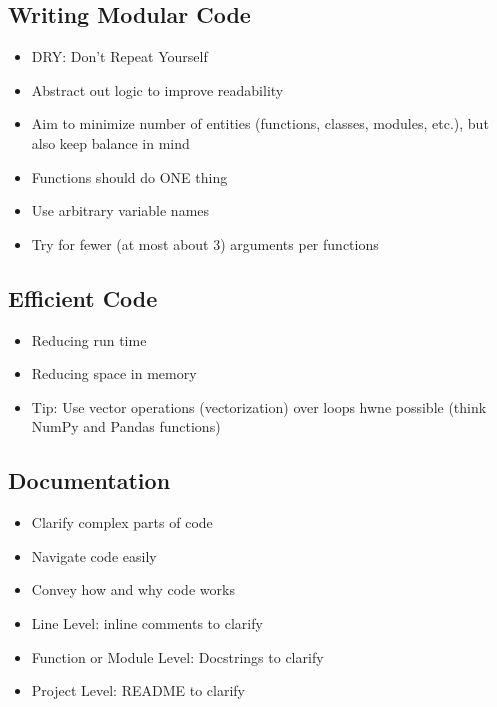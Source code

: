 \subsection{Writing Modular Code}
\begin{itemize}
	\item DRY: Don't Repeat Yourself
	\item Abstract out logic to improve readability
	\item Aim to minimize number of entities (functions, classes, modules, etc.), but also keep balance in mind
	\item Functions should do ONE thing
	\item Use arbitrary variable names
	\item Try for fewer (at most about 3) arguments per functions
\end{itemize}

\subsection{Efficient Code}
\begin{itemize}
	\item Reducing run time
	\item Reducing space in memory
	\item Tip: Use vector operations (vectorization) over loops hwne possible (think NumPy and Pandas functions)
\end{itemize}

\subsection{Documentation}
\begin{itemize}
	\item Clarify complex parts of code
	\item Navigate code easily
	\item Convey how and why code works
	\item Line Level: inline comments to clarify
	\item Function or Module Level: Docstrings to clarify
	\item Project Level: README to clarify
\end{itemize}

